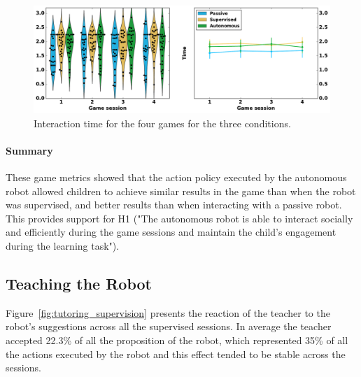 \begin{figure}[ht]
	\includegraphics[width=1\linewidth]{time.pdf}
	\centering
	\caption{Interaction time for the four games for the three conditions.}
	\label{fig:tutoring_time}
\end{figure}


\paragraph{Summary}

These game metrics showed that the action policy executed by the autonomous robot allowed children to achieve similar results in the game than when the robot was supervised, and better results than when interacting with a passive robot. This provides support for H1 ("The autonomous robot is able to interact socially and efficiently during the game sessions and maintain the child's engagement during the learning task"). 

\subsection{Teaching the Robot}

Figure~\ref{fig:tutoring_supervision} presents the reaction of the teacher to the robot's suggestions across all the supervised sessions. In average the teacher accepted 22.3\% of all the proposition of the robot, which represented 35\% of all the actions executed by the robot and this effect tended to be stable across the sessions.

